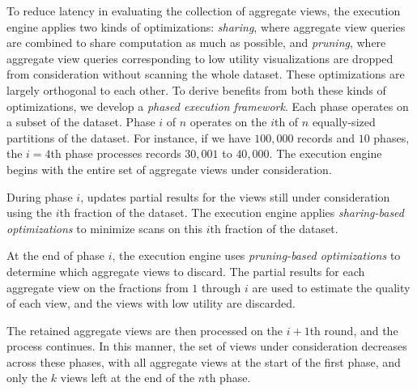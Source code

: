 To reduce latency in 
evaluating the collection of aggregate views, 
the \SeeDB execution engine  
applies two kinds of optimizations:
{\em sharing}, where aggregate view queries are combined to share computation
as much as possible, and {\em pruning}, where aggregate view queries
corresponding to low utility visualizations are dropped from consideration without scanning the whole
dataset.
These optimizations are largely orthogonal to each other.
To derive benefits from both these kinds of optimizations,
we develop a {\em phased execution framework}.
Each phase operates on a subset of the dataset.
Phase $i$ of $n$ operates on the $i$th of $n$ equally-sized partitions of the dataset. 
For instance, if we have $100,000$ records and $10$ phases,
the $i = 4$th phase processes records $30,001$ to $40,000$.
The execution engine begins 
with the entire set of aggregate views under consideration.
\begin{denselist}
\item During phase $i$, \SeeDB updates partial results
for the views
still under consideration using the $i$th fraction of the dataset.
The execution engine applies {\em sharing-based optimizations}
to minimize scans on this  $i$th fraction of the dataset.
\item At the end of phase $i$, the execution engine uses 
{\em pruning-based optimizations} to determine which aggregate views to discard.
The partial results for each aggregate view on the fractions from $1$ through $i$ are used to 
estimate the quality of each view, and the views with low utility are discarded. 
\end{denselist}
The retained aggregate views are then processed on the $i+1$th round,
and the process continues. 
In this manner, the set of views under consideration
decreases across these phases, with all aggregate views at the start 
of the first phase, and only the $k$ views left
at the end of the $n$th phase.

